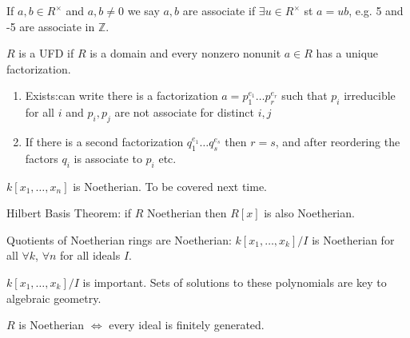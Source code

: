 \documentclass{./template}
\begin{document}
  { If $a,b\in R^\times$ and $a,b\neq 0$ we say $a,b$ are associate if $\exists u\in R^\times$ st $a=ub$, e.g. 5 and -5 are associate in $\mathbb Z$.}

  { $R$ is a UFD if $R$ is a domain and every nonzero nonunit $a\in R$ has a unique factorization.

  \begin{enumerate}[1)]
  \item{ Exists:can write there is a factorization $a=p_1^{e_1}\ldots p_r^{e_r}$ such that $p_i$ irreducible for all $i$ and $p_i,p_j$ are not associate for distinct $i,j$}

  \item{If there is a second factorization $q_1^{e_1}\ldots q_s^{e_s}$ then $r=s$, and after reordering the factors $q_i$ is associate to $p_i$ etc.}
  \end{enumerate}
  }

  {\ex $k[x_1,\ldots,x_n]$ is Noetherian. To be covered next time.}

  {\thm Hilbert Basis Theorem: if $R$ Noetherian then $R[x]$ is also Noetherian.}

  {\lemma Quotients of Noetherian rings are Noetherian: $k[x_1,\ldots,x_k]/I$ is Noetherian for all $\forall k$, $\forall n$ for all ideals $I$.}

  $k[x_1,\ldots,x_k]/I$ is important. Sets of solutions to these polynomials are key to algebraic geometry.

  {\lemma $R$ is Noetherian $\iff$ every ideal is finitely generated.}
\end{document}
